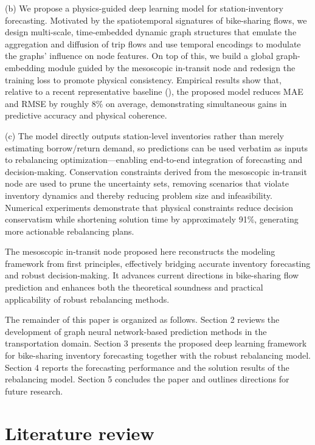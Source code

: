 \documentclass[preprint,12pt,authoryear]{elsarticle}
\begin{document}
(b) We propose a physics-guided deep learning model for station-inventory forecasting. Motivated by the spatiotemporal signatures of bike-sharing flows, we design multi-scale, time-embedded dynamic graph structures that emulate the aggregation and diffusion of trip flows and use temporal encodings to modulate the graphs' influence on node features. On top of this, we build a global graph-embedding module guided by the mesoscopic in-transit node and redesign the training loss to promote physical consistency. Empirical results show that, relative to a recent representative baseline (\cite{kong2024spatio}), the proposed model reduces MAE and RMSE by roughly 8\% on average, demonstrating simultaneous gains in predictive accuracy and physical coherence.

(c) The model directly outputs station-level inventories rather than merely estimating borrow/return demand, so predictions can be used verbatim as inputs to rebalancing optimization—enabling end-to-end integration of forecasting and decision-making. Conservation constraints derived from the mesoscopic in-transit node are used to prune the uncertainty sets, removing scenarios that violate inventory dynamics and thereby reducing problem size and infeasibility. Numerical experiments demonstrate that physical constraints reduce decision conservatism while shortening solution time by approximately 91\%, generating more actionable rebalancing plans.

The mesoscopic in-transit node proposed here reconstructs the modeling framework from first principles, effectively bridging accurate inventory forecasting and robust decision-making. It advances current directions in bike-sharing flow prediction and enhances both the theoretical soundness and practical applicability of robust rebalancing methods.

The remainder of this paper is organized as follows. Section 2 reviews the development of graph neural network-based prediction methods in the transportation domain. Section 3 presents the proposed deep learning framework for bike-sharing inventory forecasting together with the robust rebalancing model. Section 4 reports the forecasting performance and the solution results of the rebalancing model. Section 5 concludes the paper and outlines directions for future research.


\section{Literature review}
\end{document}
